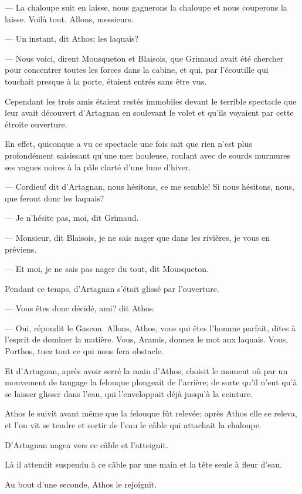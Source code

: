 — La chaloupe suit en laisse, nous gagnerons la chaloupe et nous couperons la laisse. Voilà tout. Allons, messieurs.

— Un instant, dit Athos; les laquais?

— Nous voici, dirent Mousqueton et Blaisois, que Grimaud avait été chercher pour concentrer toutes les forces dans la cabine, et qui, par l'écoutille qui touchait presque à la porte, étaient entrés sans être vus.

Cependant les trois amis étaient restés immobiles devant le terrible spectacle que leur avait découvert d'Artagnan en soulevant le volet et qu'ils voyaient par cette étroite ouverture.

En effet, quiconque a vu ce spectacle une fois sait que rien n'est plus profondément saisissant qu'une mer houleuse, roulant avec de sourds murmures ses vagues noires à la pâle clarté d'une lune d'hiver.

— Cordieu! dit d'Artagnan, nous hésitons, ce me semble! Si nous hésitons, nous, que feront donc les laquais?

— Je n'hésite pas, moi, dit Grimaud.

— Monsieur, dit Blaisois, je ne sais nager que dans les rivières, je vous en préviens.

— Et moi, je ne sais pas nager du tout, dit Mousqueton.

Pendant ce temps, d'Artagnan s'était glissé par l'ouverture.

— Vous êtes donc décidé, ami? dit Athos.

— Oui, répondit le Gascon. Allons, Athos, vous qui êtes l'homme parfait, dites à l'esprit de dominer la matière. Vous, Aramis, donnez le mot aux laquais. Vous, Porthos, tuez tout ce qui nous fera obstacle.

Et d'Artagnan, après avoir serré la main d'Athos, choisit le moment où par un mouvement de tangage la felouque plongeait de l'arrière; de sorte qu'il n'eut qu'à se laisser glisser dans l'eau, qui l'enveloppait déjà jusqu'à la ceinture.

Athos le suivit avant même que la felouque fût relevée; après Athos elle se releva, et l'on vit se tendre et sortir de l'eau le câble qui attachait la chaloupe.

D'Artagnan nagea vers ce câble et l'atteignit.

Là il attendit suspendu à ce câble par une main et la tête seule à fleur d'eau.

Au bout d'une seconde, Athos le rejoignit.

